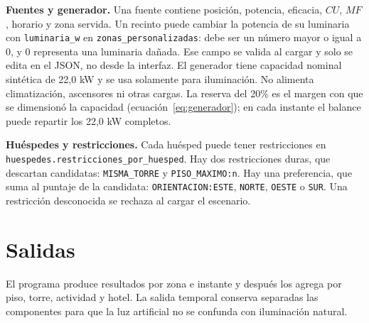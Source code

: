 \documentclass[12pt,a4paper]{article}
\newcommand{\codigo}[1]{\texttt{#1}}
\begin{document}
\textbf{Fuentes y generador.} Una fuente contiene posición, potencia, eficacia, $CU$, $MF$, horario y zona servida. Un recinto puede cambiar la potencia de su luminaria con \codigo{luminaria\_w} en \codigo{zonas\_personalizadas}: debe ser un número mayor o igual a 0, y 0 representa una luminaria dañada. Ese campo se valida al cargar y solo se edita en el JSON, no desde la interfaz. El generador tiene capacidad nominal sintética de 22,0 kW y se usa solamente para iluminación. No alimenta climatización, ascensores ni otras cargas. La reserva del 20\% es el margen con que se dimensionó la capacidad (ecuación~\ref{eq:generador}); en cada instante el balance puede repartir los 22,0 kW completos.

\textbf{Huéspedes y restricciones.} Cada huésped puede tener restricciones en \codigo{huespedes.restricciones\_por\_huesped}. Hay dos restricciones duras, que descartan candidatas: \codigo{MISMA\_TORRE} y \codigo{PISO\_MAXIMO:n}. Hay una preferencia, que suma al puntaje de la candidata: \codigo{ORIENTACION:ESTE}, \codigo{NORTE}, \codigo{OESTE} o \codigo{SUR}. Una restricción desconocida se rechaza al cargar el escenario.

\section{Salidas}

El programa produce resultados por zona e instante y después los agrega por piso, torre, actividad y hotel. La salida temporal conserva separadas las componentes para que la luz artificial no se confunda con iluminación natural.
\end{document}

